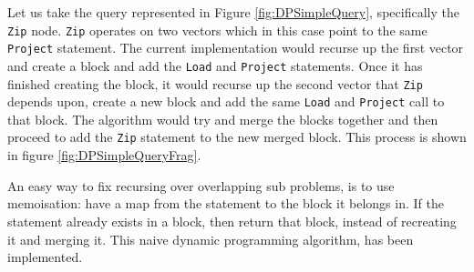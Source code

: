 Let us take the query represented in Figure \ref{fig:DPSimpleQuery}, specifically the \texttt{Zip} node. \texttt{Zip} operates on two vectors which in this case point to the same \texttt{Project} statement. The current implementation would recurse up the first vector and create a block and add the \texttt{Load} and \texttt{Project} statements. Once it has finished creating the block, it would recurse up the second vector that \texttt{Zip} depends upon, create a new block and add the same \texttt{Load} and \texttt{Project} call to that block. The algorithm would try and merge the blocks together and then proceed to add the \texttt{Zip} statement to the new merged block. This process is shown in figure \ref{fig:DPSimpleQueryFrag}.

An easy way to fix recursing over overlapping sub problems, is to use memoisation: have a map from the statement to the block it belongs in. If the statement already exists in a block, then return that block, instead of recreating it and merging it. This naive dynamic programming algorithm, has been implemented.

